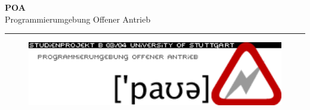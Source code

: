 \renewcommand{\thefootnote}{\fnsymbol{footnote}}
{
\Huge
\raggedright
\textbf{POA} \\
\huge Programmierumgebung Offener Antrieb
\rule{\textwidth}{0.75pt}
\par
}
\begin{flushleft}
\normalsize
\version
\vfill

\begin{figure}[htbp]
\begin{center}
\includegraphics[width=15cm]{../common/poa-logo}
\end{center}
\end{figure}

\end{flushleft}
\vfill

